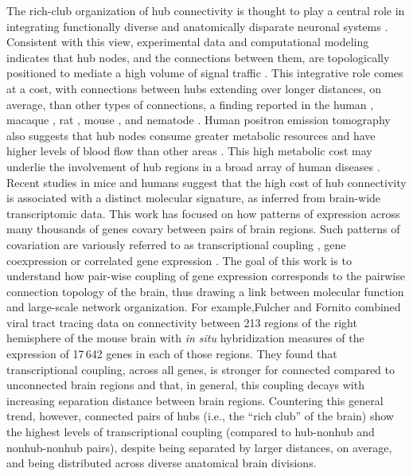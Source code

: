\documentclass[10pt,letterpaper]{article}
\begin{document}
The rich-club organization of hub connectivity is thought to play a central role in integrating functionally diverse and anatomically disparate neuronal systems \cite{Fornito2015, vandenHeuvel:2013ij, ZamoraLopez:2010hy, Crossley2014, Crossley:2013kl}.
Consistent with this view, experimental data and computational modeling indicates that hub nodes, and the connections between them, are topologically positioned to mediate a high volume of signal traffic \cite{vandenHeuvel:2012kh, Harriger2012, Misic:2014it, Misic:2015jw}.
This integrative role comes at a cost, with connections between hubs extending over longer distances, on average, than other types of connections, a finding reported in the human \cite{vandenHeuvel:2012kh}, macaque \cite{Harriger2012}, rat \cite{VandenHeuvel2016b}, mouse \cite{Fulcher:2016ck}, and nematode \cite{Towlson2013}.
Human positron emission tomography also suggests that hub nodes consume greater metabolic resources and have higher levels of blood flow than other areas \cite{Tomasi:2013kl, Collin:2014kq, Liang2013a}.
This high metabolic cost may underlie the involvement of hub regions in a broad array of human diseases \cite{Fornito2015, Bullmore:2012vl, Crossley2014}. \\ 
Recent studies in mice and humans suggest that the high cost of hub connectivity is associated with a distinct
molecular signature, as inferred from brain-wide transcriptomic data. 
This work has focused on how patterns of expression across many thousands of genes covary between pairs of brain regions.
Such patterns of covariation are variously referred to as transcriptional coupling \cite{Fulcher:2016ck}, gene coexpression \cite{Krienen:2016eq} or correlated gene expression \cite{Richiardi2015, Mills2017, Goel2014}.
The goal of this work is to understand how pair-wise coupling of gene expression corresponds to the pairwise connection topology of the brain, thus drawing a link between molecular function and large-scale network organization.
For example,Fulcher and Fornito \cite{Fulcher:2016ck} combined viral tract tracing data on connectivity between 213 regions of the right hemisphere of the mouse brain \cite{Oh2014} with \emph{in situ} hybridization measures of the expression of 17\,642 genes in each of those regions.
They found that transcriptional coupling, across all genes, is stronger for connected compared to unconnected brain regions and that, in general, this coupling decays with increasing separation distance between brain regions.
Countering this general trend, however, connected pairs of hubs (i.e., the ``rich club'' of the brain) show the highest levels of transcriptional coupling (compared to hub-nonhub and nonhub-nonhub pairs), despite being separated by larger distances, on average, and being distributed across diverse anatomical brain divisions.
\end{document}
